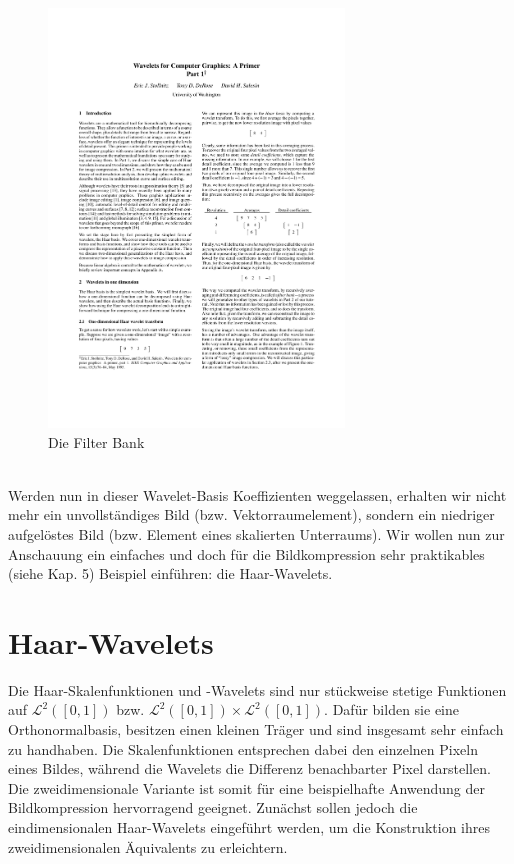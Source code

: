 \begin{figure}[h]
	\centering
	\includegraphics[page=11, trim=60 695 305 100, clip, width=0.7\textwidth]{4_wavelet_final[14255].pdf}
	\caption{Die Filter Bank}
\end{figure}\\
Werden nun in dieser Wavelet-Basis Koeffizienten weggelassen, erhalten wir nicht mehr ein unvollständiges Bild (bzw. Vektorraumelement), sondern ein niedriger aufgelöstes Bild (bzw. Element eines skalierten Unterraums). Wir wollen nun zur Anschauung ein einfaches und doch für die Bildkompression sehr praktikables (siehe Kap. 5) Beispiel einführen: die Haar-Wavelets.


\section{Haar-Wavelets}

Die Haar-Skalenfunktionen und -Wavelets sind nur stückweise stetige Funktionen auf $\mathcal{L}^2([0,1])$ bzw. $\mathcal{L}^2([0,1])\times\mathcal{L}^2([0,1])$. Dafür bilden sie eine Orthonormalbasis, besitzen einen kleinen Träger und sind insgesamt sehr einfach zu handhaben. Die Skalenfunktionen entsprechen dabei den einzelnen Pixeln eines Bildes, während die Wavelets die Differenz benachbarter Pixel darstellen. Die zweidimensionale Variante ist somit für eine beispielhafte Anwendung der Bildkompression hervorragend geeignet. Zunächst sollen jedoch die eindimensionalen Haar-Wavelets eingeführt werden, um die Konstruktion ihres zweidimensionalen Äquivalents zu erleichtern.

